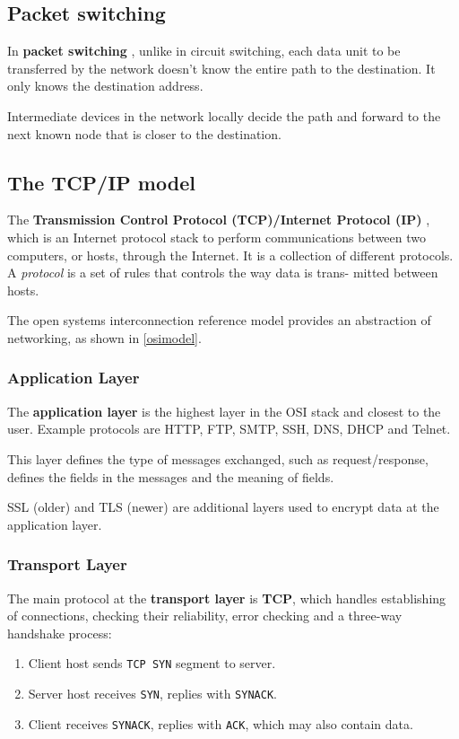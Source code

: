 \subsection{Packet switching}
In \textbf{packet switching} , unlike in circuit switching, each data unit to be transferred by the network doesn't know the entire path to the destination. It only knows the destination address.

Intermediate devices in the network locally decide the path and forward to the next known node that is closer to the destination.

\subsection{The TCP/IP model}
The \textbf{Transmission Control Protocol (TCP)/Internet Protocol (IP)} , which is an Internet protocol stack to perform communications between two computers, or hosts, through the Internet. It is a collection of different protocols. A \emph{protocol}  is a set of rules that controls the way data is trans- mitted between hosts.

The open systems interconnection reference model provides an abstraction of networking, as shown in \autoref{osimodel}.

\subsubsection{Application Layer}
The \textbf{application layer} is the highest layer in the OSI stack and closest to the user. Example protocols are HTTP, FTP, SMTP, SSH, DNS, DHCP and Telnet.

This layer defines the type of messages exchanged, such as request/response, defines the fields in the messages and the meaning of fields.

SSL (older) and TLS (newer) are additional layers used to encrypt data at the application layer.

\subsubsection{Transport Layer}
The main protocol at the \textbf{transport layer} is \textbf{TCP}, which handles establishing of connections, checking their reliability, error checking and a three-way handshake process:
\begin{enumerate}
	\item Client host sends \texttt{TCP SYN} segment to server.
	\item Server host receives \texttt{SYN}, replies with \texttt{SYNACK}.
	\item Client receives \texttt{SYNACK}, replies with \texttt{ACK}, which may also contain data.
\end{enumerate}

